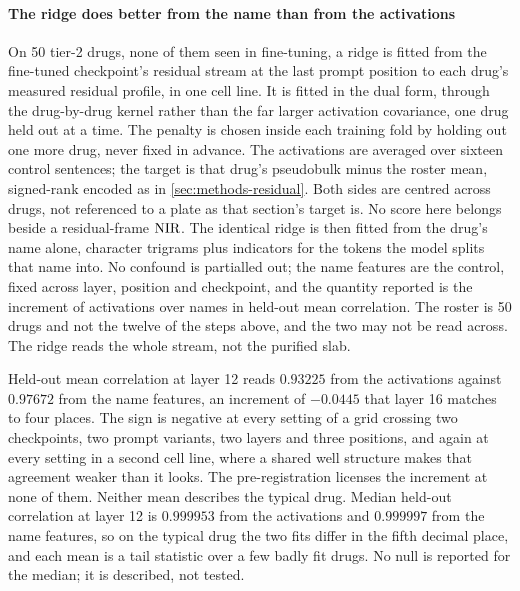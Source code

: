 \paragraph{The ridge does better from the name than from the activations} On
\num{50} tier-2 drugs, none of them seen in fine-tuning, a ridge is fitted from
the fine-tuned checkpoint's residual stream at the last prompt position to each
drug's measured residual profile, in one cell line. It
is fitted in the dual form, through the drug-by-drug kernel rather than the far
larger activation covariance, one drug held out at a time. The penalty is
chosen inside each training fold by holding out one more drug, never fixed in
advance. The activations are averaged over sixteen control sentences; the target
is that drug's pseudobulk minus the roster mean, signed-rank encoded as in
\cref{sec:methods-residual}. Both sides are centred across drugs, not referenced
to a plate as that section's target is. No score here belongs beside a
residual-frame $\textrm{NIR}$. The identical ridge is then fitted from the drug's name
alone, character trigrams plus indicators for the tokens the model splits that
name into. No confound is partialled out; the name features are the control,
fixed across layer, position and checkpoint, and the quantity reported is the
increment of activations over names in held-out mean correlation. The roster is
\num{50} drugs and not the twelve of the steps above, and the two may not be
read across. The ridge reads the whole stream, not the purified slab.

Held-out mean correlation at layer 12 reads $0.93225$ from the activations
against $0.97672$ from the name features, an increment of $-0.0445$ that layer
16 matches to four places. The sign is negative at every setting of a grid
crossing two checkpoints, two prompt variants, two layers and three positions,
and again at every setting in a second cell line, where a shared well structure
makes that agreement weaker than it looks. The pre-registration licenses the
increment at none of them. Neither mean describes the typical drug. Median
held-out correlation at layer 12 is $0.999953$ from the activations and
$0.999997$ from the name features, so on the typical drug the two fits differ in
the fifth decimal place, and each mean is a tail statistic over a few badly fit
drugs. No null is reported for the median; it is described, not tested.


